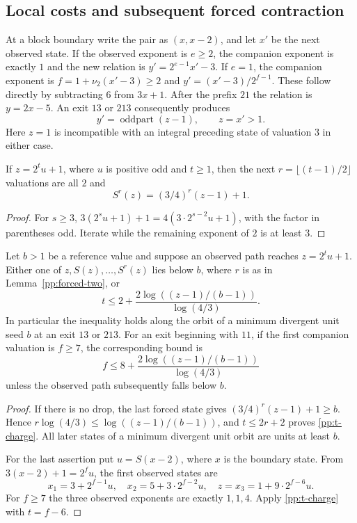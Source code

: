 \subsection{Local costs and subsequent forced contraction}

At a block boundary write the pair as $(x,x-2)$, and let $x'$ be the
next observed state. If the observed exponent is $e\ge2$, the
companion exponent is exactly $1$ and the new relation is
$y'=2^{e-1}x'-3$. If $e=1$, the companion exponent is
$f=1+\nu_2(x'-3)\ge2$ and $y'=(x'-3)/2^{f-1}$.
These follow directly by subtracting $6$ from $3x+1$.
After the prefix $21$ the relation is $y=2x-5$.
An exit $13$ or $213$ consequently produces
\[
 y'=\operatorname{oddpart}(z-1),\qquad z=x' >1.
\]
Here $z=1$ is incompatible with an integral preceding state of
valuation $3$ in either case.

\begin{lemma}\label{pp:forced-two}
If $z=2^t u+1$, where $u$ is positive odd and $t\ge1$, then the next
$r=\lfloor(t-1)/2\rfloor$ valuations are all $2$ and
\[
 S^r(z)=(3/4)^r(z-1)+1.
\]
\end{lemma}
\begin{proof}
For $s\ge3$,
$3(2^s u+1)+1=4(3\cdot2^{s-2}u+1)$, with the factor in parentheses
odd. Iterate while the remaining exponent of $2$ is at least $3$.
\end{proof}

\begin{proposition}
\label{pp:buffer-cost}
Let $b>1$ be a reference value and suppose an observed path reaches
$z=2^t u+1$. Either one of $z,S(z),\ldots,S^r(z)$ lies below $b$,
where $r$ is as in Lemma~\ref{pp:forced-two}, or
\begin{equation}\label{pp:t-charge}
 t\le 2+\frac{2\log((z-1)/(b-1))}{\log(4/3)}.
\end{equation}
In particular the inequality holds along the orbit of a minimum
divergent unit seed $b$ at an exit $13$ or $213$.
For an exit beginning with $11$, if the first companion valuation is
$f\ge7$, the corresponding bound is
\begin{equation}\label{pp:f-charge}
 f\le 8+\frac{2\log((z-1)/(b-1))}{\log(4/3)}
\end{equation}
unless the observed path subsequently falls below $b$.
\end{proposition}
\begin{proof}
If there is no drop, the last forced state gives
$(3/4)^r(z-1)+1\ge b$. Hence
$r\log(4/3)\le\log((z-1)/(b-1))$, and $t\le2r+2$ proves
\eqref{pp:t-charge}. All later states of a minimum divergent unit
orbit are units at least $b$.

For the last assertion put $u=S(x-2)$, where $x$ is the boundary
state. From $3(x-2)+1=2^f u$, the first observed states are
\[
 x_1=3+2^{f-1}u,\quad x_2=5+3\cdot2^{f-2}u,\quad
 z=x_3=1+9\cdot2^{f-6}u.
\]
For $f\ge7$ the three observed exponents are exactly $1,1,4$.
Apply \eqref{pp:t-charge} with $t=f-6$.
\end{proof}

